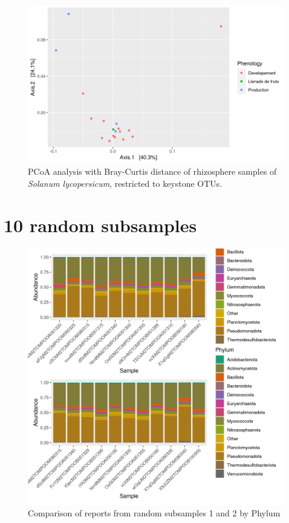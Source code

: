 \documentclass{article}
\begin{document}
\begin{figure}
    \centering
    \includegraphics[scale = 0.7]{tomate_clave_pcoa.png}
    \caption{PCoA analysis with Bray-Curtis distance of rhizosphere samples of \textit{Solanum lycopersicum}, restricted to keystone OTUs.}
    \label{fig:tomate_pcoa_key_otus}
\end{figure}


\section{10 random subsamples}

\begin{figure}
\centering
\includegraphics[scale=0.8]{tomate_aleatorio1_1.csv_tomate_aleatorio1_2.csv_relative_abundance_Phylum.png}
\caption{Comparison of reports from random subsamples 1 and 2 by Phylum}
\end{figure}
\end{document}
